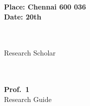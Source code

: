 \noindent \parbox{2.0in}{
	\noindent \bf Place: Chennai 600 036\\
	\noindent \bf Date: 20th \MyDate \\ 
}
\noindent \parbox{2.4in}{
\begin{flushright}
	\noindent \\
	\noindent \textbf{\MyAuthor} \\
	\noindent Research Scholar \\
\end{flushright}
}
\noindent \hspace*{3.3in}
\parbox{2.4in}{
\begin{flushright}
	\noindent \\
	\noindent \\
	\noindent \textbf{Prof.~1} \\
	\noindent Research Guide \\ %
\end{flushright}
}




